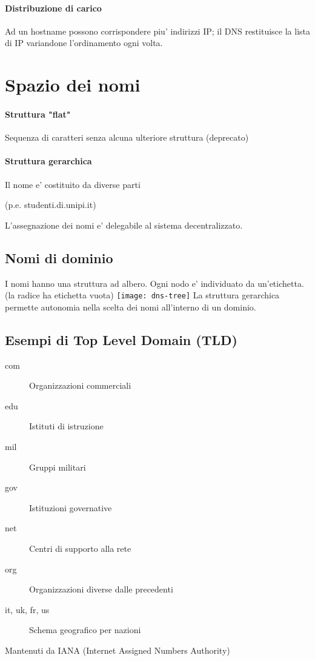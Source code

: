 \paragraph{Distribuzione di carico} Ad un hostname possono corrispondere piu' indirizzi IP; il DNS restituisce la lista di IP variandone l'ordinamento ogni volta.
\section{Spazio dei nomi}
{\color{YellowOrange}\paragraph{Struttura "flat"} Sequenza di caratteri senza alcuna ulteriore struttura (deprecato)}
\paragraph{Struttura gerarchica} Il nome e' costituito da diverse parti
\begin{center}
    (p.e. studenti.di.unipi.it)
\end{center}
L'assegnazione dei nomi e' delegabile al sistema decentralizzato. 
\subsection{Nomi di dominio}
I nomi hanno una struttura ad albero. Ogni nodo e' individuato da un'etichetta.(la radice ha etichetta vuota)
\newline
\texttt{[image: dns-tree]}
La struttura gerarchica permette autonomia nella scelta dei nomi all'interno di un dominio.
\subsection{Esempi di Top Level Domain (TLD)}
\begin{description}
    \item[com] Organizzazioni commerciali
    \item[edu] Istituti di istruzione
    \item[mil] Gruppi militari
    \item[gov] Istituzioni governative
    \item[net] Centri di supporto alla rete
    \item[org] Organizzazioni diverse dalle precedenti
    \item[it, uk, fr, us] Schema geografico per nazioni  
\end{description}
Mantenuti da IANA (Internet Assigned Numbers Authority)
